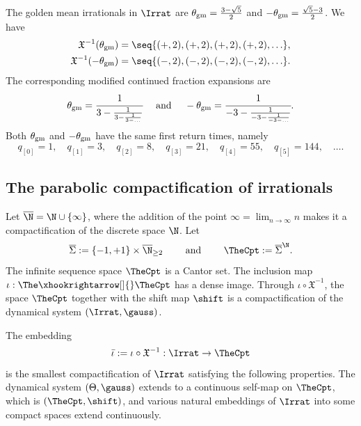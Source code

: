 \documentclass{amsart}
\begin{document}
\begin{example}
    The golden mean irrationals in $\Irrat$ are $\theta_{\textnormal{gm}} = \frac{3-\sqrt{5}}{2}$ and $-\theta_{\textnormal{gm}} = \frac{\sqrt{5}-3}{2}$. We have
    \begin{align*}
        \mathfrak{X}^{-1}(\theta_{\textnormal{gm}}) &= \seq{ (+,2), (+,2), (+,2), (+,2),\ldots },\\
        \mathfrak{X}^{-1}(-\theta_{\textnormal{gm}}) &= \seq{ (-,2), (-,2), (-,2), (-,2), \ldots }.
    \end{align*}
    The corresponding modified continued fraction expansions are
    \[
        \theta_{\textnormal{gm}} = \cfrac{1}{3 - \frac{1}{3 - \frac{1}{3 - \ldots}}} \quad \text{ and } \quad 
        -\theta_{\textnormal{gm}} = \cfrac{1}{-3 - \frac{1}{-3 - \frac{1}{-3 - \ldots}}}.
    \]
    Both $\theta_{\textnormal{gm}}$ and $-\theta_{\textnormal{gm}}$ have the same first return times, namely
    \[
        q_{[0]} = 1, \quad q_{[1]} = 3, \quad q_{[2]}=8, \quad q_{[3]} = 21, \quad q_{[4]} = 55, \quad q_{[5]} = 144, \quad \ldots.
    \]
\end{example}

\subsection{The parabolic compactification of irrationals}
\label{ss:compactification}

Let $\overline{\N} = \N \cup \{\infty\}$, where the addition of the point $\displaystyle \infty = \lim_{n \to \infty} n$ makes it a compactification of the discrete space $\N$.
Let 
\begin{equation}
    \label{eq:dfn.ovlTheta}
\overline{\Sigma} := \{-1,+1\} \times \overline{\N}_{\geq 2} \qquad \text{ and } \qquad
    \TheCpt := \overline{\Sigma}^{\N}.
\end{equation}
The infinite sequence space $\TheCpt$ is a Cantor set. The inclusion map $\iota: \The \xhookrightarrow[]{} \TheCpt$ has a dense image.
Through $\iota \circ \mathfrak{X}^{-1}$, the space $\TheCpt$ together with the shift map $\shift$ is a compactification of the dynamical system $(\Irrat,\gauss)$.

\begin{theorem}\label{thm:ovlTheta:univers}
    The embedding 
    \[
    \bar{\iota} :=\iota \circ \mathfrak{X}^{-1}: \Irrat \to \TheCpt
    \]
    is the smallest compactification of $\Irrat$ satisfying the following properties.
    The dynamical system $(\Theta,\gauss)$ extends to a continuous self-map on $\TheCpt$, which is $(\TheCpt, \shift)$, and various natural embeddings of $\Irrat$ into some compact spaces extend continuously.
\end{theorem}
\end{document}
